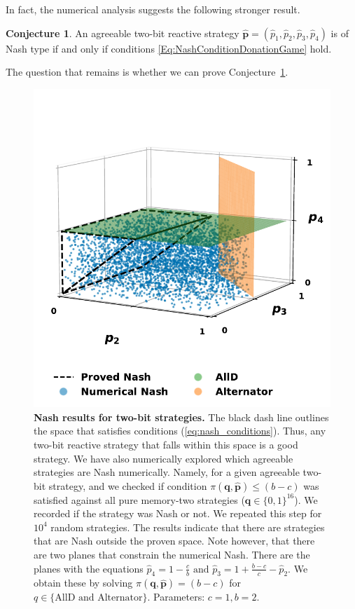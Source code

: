 \documentclass{article}
\theoremstyle{definition}
\newtheorem{conjecture}[theorem]{Conjecture}
\begin{document}
In fact, the numerical analysis suggests the following stronger result.

\begin{conjecture}\label{conjecture:nash_from_numerical_results} An agreeable
two-bit reactive strategy \(\mathbf{\hat{p}} = (\hat{p}_{1}, \hat{p}_{2},
\hat{p}_{3}, \hat{p}_{4})\) is of Nash type if and only if conditions
\eqref{Eq:NashConditionDonationGame} hold. 
\end{conjecture}

The question that remains is whether we can prove Conjecture~\ref{conjecture:nash_from_numerical_results}.
\begin{figure}[!htbp]
  \centering
  \includegraphics[width=.35\textwidth]{static/for_akin.pdf}
  \caption{\textbf{Nash results for two-bit strategies.} The black dash line
  outlines the space that satisfies conditions (\ref{eq:nash_conditions}). Thus,
  any two-bit reactive strategy that falls within this space is a good strategy.
  We have also numerically explored which agreeable strategies are Nash
  numerically. Namely, for a given agreeable two-bit strategy, and we checked if
  condition \(\pi({\mathbf{q}}, \mathbf{\hat{p}}) \leq (b\!-\!c)\) was satisfied
  against all pure memory-two strategies (\(\mathbf{q} \in \{0, 1\}^{16}\)). We
  recorded if the strategy was Nash or not. We repeated this step for \(10 ^ 4\)
  random strategies. The results indicate that there are strategies that
  are Nash outside the proven space. Note however, that there are two planes
  that constrain the numerical Nash. There are the planes with the equations
  \(\hat{p}_4 = 1 - \frac{c}{b} \text{ and }
  \hat{p}_3 = 1 + \frac{b\!-\!c}{c} - \hat{p}_2\). We obtain these by solving \(\pi(\mathbf{q}, \mathbf{\hat{p}}) =
  (b\!-\!c)\) for \(q \in \{\text{AllD and Alternator}\}\). Parameters: \(c=1, b=2\).
  }\label{fig:two_bit_reactive_nash_results}
\end{figure}


\end{document}
